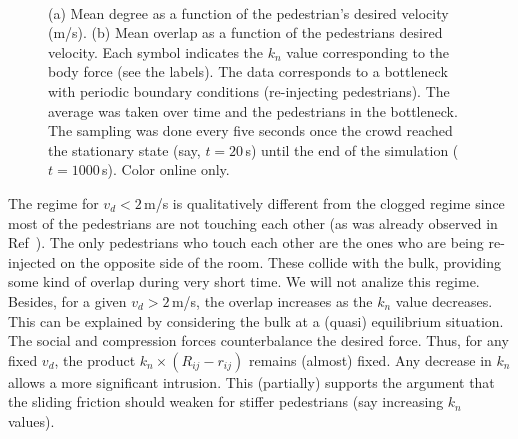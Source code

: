 \documentclass[preprint,12pt]{elsarticle}
\begin{document}
\begin{figure}[!htbp]
\centering
{}\ 
\\
\caption[width=0.47\columnwidth]{(a) Mean degree as a function of the
pedestrian’s desired velocity (m/s). (b) Mean overlap as a function of the
pedestrians desired velocity. Each symbol indicates the $k_n$ value
corresponding to the body force (see the labels). The data corresponds to a
bottleneck with periodic boundary conditions (re-injecting pedestrians). The
average was taken over time and the pedestrians in the bottleneck. The sampling
was done every five seconds once the crowd reached the stationary state (say,
$t=20\,$s) until the end of the simulation ($t=1000\,$s). Color online only.}
\label{degree_overlap_vd}
\end{figure}

The regime for $v_d<2\,$m/s is qualitatively different from the clogged regime
since most of the  pedestrians are not touching each other (as was already
observed in Ref~\cite{dorso_2005,dorso_2011}). The only pedestrians who touch
each  other are the ones who are being re-injected on the opposite side of the
room. These collide with the bulk, providing some kind of overlap during very
short time. We will not analize this regime.\\

Besides, for a given $v_d>2\,$m/s, the overlap increases as the $k_n$ value
decreases.  This can be explained by considering the bulk at a (quasi)
equilibrium situation.  The social and compression forces counterbalance the
desired force. Thus, for any fixed $v_d$, the product $k_n \times
(R_{ij}-r_{ij})$ remains (almost) fixed. Any decrease in $k_n$ allows a more
significant intrusion. This (partially) supports the argument that the sliding
friction should weaken for stiffer pedestrians (say increasing $k_n$ values). \\
\end{document}
